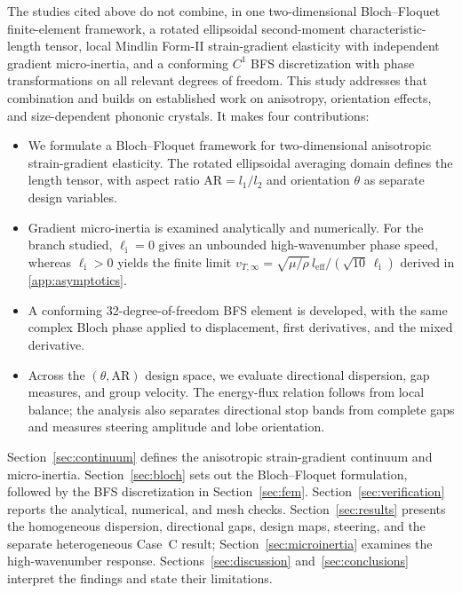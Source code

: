 The studies cited above do not combine, in one two-dimensional Bloch--Floquet finite-element framework, a rotated ellipsoidal second-moment characteristic-length tensor, local Mindlin Form-II strain-gradient elasticity with independent gradient micro-inertia, and a conforming $C^1$ BFS discretization with phase transformations on all relevant degrees of freedom. This study addresses that combination and builds on established work on anisotropy, orientation effects, and size-dependent phononic crystals. It makes four contributions:
\begin{itemize}
  \item We formulate a Bloch--Floquet framework for two-dimensional anisotropic strain-gradient elasticity. The rotated ellipsoidal averaging domain defines the length tensor, with aspect ratio $\mathrm{AR}=l_1/l_2$ and orientation $\theta$ as separate design variables.
  \item Gradient micro-inertia is examined analytically and numerically. For the branch studied, $\ell_{\mathrm{i}}=0$ gives an unbounded high-wavenumber phase speed, whereas $\ell_{\mathrm{i}}>0$ yields the finite limit $v_{T,\infty}=\sqrt{\mu/\rho}\,l_{\mathrm{eff}}/(\sqrt{10}\,\ell_{\mathrm{i}})$ derived in \ref{app:asymptotics}.
  \item A conforming 32-degree-of-freedom BFS element is developed, with the same complex Bloch phase applied to displacement, first derivatives, and the mixed derivative.
  \item Across the $(\theta,\mathrm{AR})$ design space, we evaluate directional dispersion, gap measures, and group velocity. The energy-flux relation follows from local balance; the analysis also separates directional stop bands from complete gaps and measures steering amplitude and lobe orientation.
\end{itemize}

Section~\ref{sec:continuum} defines the anisotropic strain-gradient continuum and micro-inertia. Section~\ref{sec:bloch} sets out the Bloch--Floquet formulation, followed by the BFS discretization in Section~\ref{sec:fem}. Section~\ref{sec:verification} reports the analytical, numerical, and mesh checks. Section~\ref{sec:results} presents the homogeneous dispersion, directional gaps, design maps, steering, and the separate heterogeneous Case~C result; Section~\ref{sec:microinertia} examines the high-wavenumber response. Sections~\ref{sec:discussion} and~\ref{sec:conclusions} interpret the findings and state their limitations.
